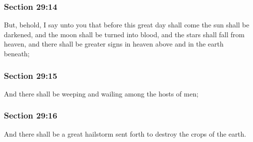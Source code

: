 	\subsubsection{Section 29:14} %
		\label{DC29-14}

		But, behold, I say unto you that before this great day shall come the sun shall be darkened, and the moon shall be turned into blood, and the stars shall fall from heaven, and there shall be greater signs in heaven above and in the earth beneath;


	\subsubsection{Section 29:15} %
		\label{DC29-15}

		And there shall be weeping and wailing among the hosts of men;


	\subsubsection{Section 29:16} %
		\label{DC29-16}

		And there shall be a great hailstorm sent forth to destroy the crops of the earth.


